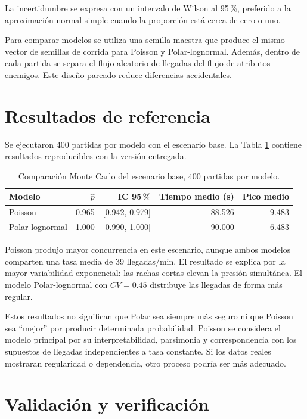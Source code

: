 \documentclass[12pt,a4paper]{article}
\begin{document}
La incertidumbre se expresa con un intervalo de Wilson al 95\,\%, preferido a la
aproximaci\'on normal simple cuando la proporci\'on est\'a cerca de cero o uno.

Para comparar modelos se utiliza una semilla maestra que produce el mismo vector
de semillas de corrida para Poisson y Polar-lognormal. Adem\'as, dentro de cada
partida se separa el flujo aleatorio de llegadas del flujo de atributos enemigos.
Este dise\~no pareado reduce diferencias accidentales.

\section{Resultados de referencia}

Se ejecutaron 400 partidas por modelo con el escenario base. La Tabla
\ref{tab:resultados} contiene resultados reproducibles con la versi\'on entregada.

\begin{table}[H]
\centering
\caption{Comparaci\'on Monte Carlo del escenario base, 400 partidas por modelo.}
\label{tab:resultados}
\begin{tabular}{lrrrr}
\toprule
Modelo & $\widehat p$ & IC 95\,\% & Tiempo medio (s) & Pico medio \\
\midrule
Poisson & 0.965 & [0.942, 0.979] & 88.526 & 9.483 \\
Polar-lognormal & 1.000 & [0.990, 1.000] & 90.000 & 6.483 \\
\bottomrule
\end{tabular}
\end{table}

Poisson produjo mayor concurrencia en este escenario, aunque ambos modelos
comparten una tasa media de 39 llegadas/min. El resultado se explica por la mayor
variabilidad exponencial: las rachas cortas elevan la presi\'on simult\'anea. El
modelo Polar-lognormal con $CV=0.45$ distribuye las llegadas de forma m\'as regular.

Estos resultados no significan que Polar sea siempre m\'as seguro ni que Poisson
sea ``mejor'' por producir determinada probabilidad. Poisson se considera el
modelo principal por su interpretabilidad, parsimonia y correspondencia con los
supuestos de llegadas independientes a tasa constante. Si los datos reales
mostraran regularidad o dependencia, otro proceso podr\'ia ser m\'as adecuado.

\section{Validaci\'on y verificaci\'on}
\end{document}
